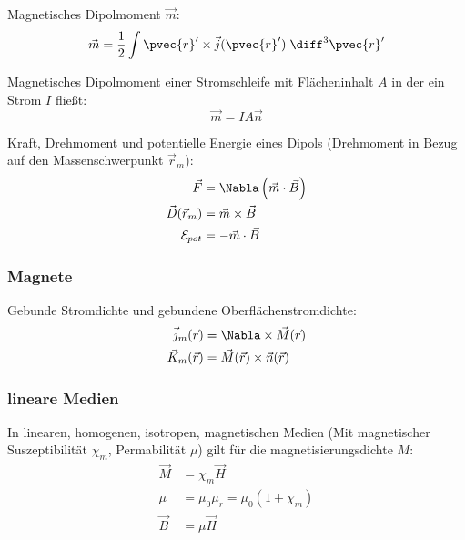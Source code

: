 \documentclass[11pt]{article}
\numberwithin{equation}{section}
\begin{document}
        Magnetisches Dipolmoment $\vec{m}$:
        \begin{equation}
          \begin{aligned}
            \vec{m} = \frac{1}{2}\int \pvec{r}'\times\vec{j}(\pvec{r}')\;\diff^3\pvec{r}'
          \end{aligned}
        \end{equation}

        Magnetisches Dipolmoment einer Stromschleife mit Flächeninhalt $A$ in der ein Strom $I$ fließt:
        \begin{equation}
          \vec{m} = IA\vec{n}
        \end{equation}

        Kraft, Drehmoment und potentielle Energie eines Dipols (Drehmoment in Bezug auf den Massenschwerpunkt $\vec{r}_m$):
        \begin{equation}
          \begin{aligned}
            \vec{F} &= \Nabla\left(\vec{m}\cdot\vec{B}\right) \\
            \vec{D}(\vec{r}_m) &= \vec{m}\times\vec{B} \\
            \mathcal{E}_{pot} &= -\vec{m}\cdot\vec{B} \\
          \end{aligned}
        \end{equation}

      \subsubsection{Magnete}
        Gebunde Stromdichte und gebundene Oberflächenstromdichte:
        \begin{equation}
          \begin{aligned}
            \vec{j}_m(\vec{r}) &= \Nabla\times\vec{M}(\vec{r}) \\
            \vec{K}_m(\vec{r}) &= \vec{M}(\vec{r})\times \vec{n}(\vec{r}) \\
          \end{aligned}
        \end{equation}

      \subsubsection{lineare Medien}
        In linearen, homogenen, isotropen, magnetischen Medien (Mit magnetischer Suszeptibilität $\chi_m$, Permabilität $\mu$) gilt für die magnetisierungsdichte $M$:
        \begin{equation}
          \begin{aligned}
            \vec{M} &= \chi_m\vec{H} \\
            \mu &= \mu_0 \mu_r = \mu_0(1+\chi_m) \\
            \vec{B} &= \mu \vec{H} \\
          \end{aligned}
        \end{equation}
\end{document}
